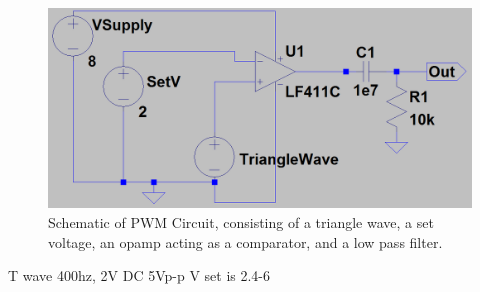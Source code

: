 \documentclass[11pt]{article} %
\begin{document}
\begin{figure}[h]
	\centering
	\includegraphics[width=\textwidth]{PWM}
	\caption{Schematic of PWM Circuit, consisting of a triangle wave, a set voltage, an opamp acting as a comparator, and a low pass filter.}
	\label{fig:PWM}
\end{figure}
T wave 400hz, 2V DC 5Vp-p V set is 2.4-6
\end{document}
